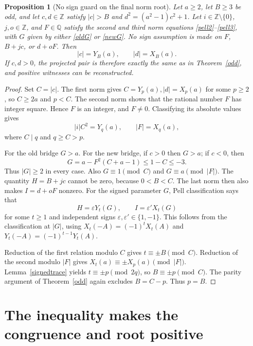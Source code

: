 \documentclass[11pt]{article}
\newtheorem{proposition}[theorem]{Proposition}
\newcommand{\Z}{\mathbb Z}\newcommand{\N}{\mathbb Z_{\ge0}}
\newcommand{\Q}{\mathbb Q}
\begin{document}
\begin{proposition}[No sign guard on the final norm root]
\label{signedblock}
Let \(a\ge2\), let \(B\ge3\) be odd, and let \(c,d\in\Z\)
satisfy \(|c|>B\) and \(d^2=(a^2-1)c^2+1\).
Let \(i\in\Z\setminus\{0\}\), \(j,o\in\Z\), and \(F\in\Q\)
satisfy the second and third norm equations
\eqref{pell2}--\eqref{pell3}, with \(G\) given by either
\eqref{oldG} or \eqref{newG}.  No sign assumption is made on
\(F\), \(B+jc\), or \(d+oF\).
Then
\[
                         |c|=Y_B(a),\qquad |d|=X_B(a).
\]
If \(c,d>0\), the projected pair is therefore exactly the same
as in Theorem~\ref{odd}, and positive witnesses can be reconstructed.
\end{proposition}
\begin{proof}
Set \(C=|c|\).  The first norm gives
\(C=Y_p(a), |d|=X_p(a)\) for some \(p\ge2\), so
\(C\ge2a\) and \(p<C\).  The second norm shows that the
rational number \(F\) has integer square.  Hence \(F\) is an
integer, and \(F\ne0\).  Classifying its absolute values gives
\[
                  |i|C^2=Y_q(a),\qquad |F|=X_q(a),
\]
where \(C\mid q\) and \(q\ge C>p\).

For the old bridge \(G>a\).  For the new bridge, if \(c>0\)
then \(G>a\); if \(c<0\), then
\[
 G=a-F^2(C+a-1)\le1-C\le-3.
\]
Thus \(|G|\ge2\) in every case.  Also
\(G\equiv1\pmod C\) and \(G\equiv a\pmod {|F|}\).
The quantity \(H=B+jc\) cannot be zero, because \(0<B<C\).
The last norm then also makes \(I=d+oF\) nonzero.
For the signed parameter \(G\), Pell classification says that
\[
          H=\varepsilon Y_t(G),\qquad I=\varepsilon'X_t(G)
\]
for some \(t\ge1\) and independent signs
\(\varepsilon,\varepsilon'\in\{1,-1\}\).
This follows from the classification at \(|G|\), using
\(X_t(-A)=(-1)^tX_t(A)\) and
\(Y_t(-A)=(-1)^{t-1}Y_t(A)\).

Reduction of the first relation modulo \(C\) gives
\(t\equiv\pm B\pmod C\).  Reduction of the second modulo
\(|F|\) gives \(X_t(a)\equiv\pm X_p(a)\pmod {|F|}\).
Lemma~\ref{signedtrace} yields \(t\equiv\pm p\pmod {2q}\),
so \(B\equiv\pm p\pmod C\).  The parity argument of
Theorem~\ref{odd} again excludes \(B=C-p\).  Thus \(p=B\).
\end{proof}

\section{The inequality makes the congruence and root positive}
\end{document}
